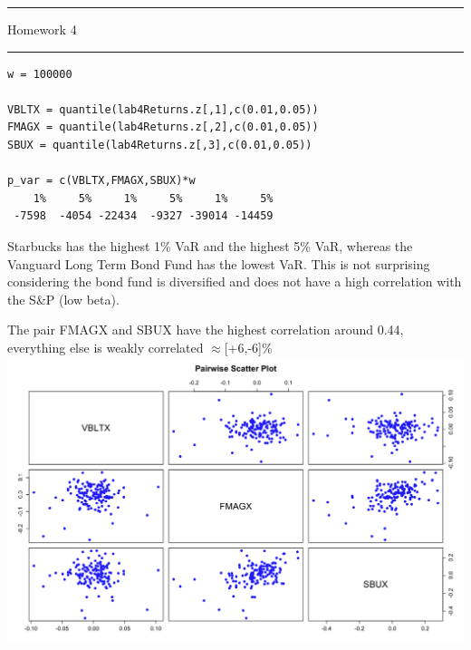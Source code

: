 \documentclass[letterpaper,12pt]{article}
\begin{document}
\thispagestyle{empty}

\hrule \vspace{0.5em}
 \hfill Homework 4 \newline \hrule

\vspace{1em}

\enumerate
\item \begin{lstlisting}
w = 100000

VBLTX = quantile(lab4Returns.z[,1],c(0.01,0.05))
FMAGX = quantile(lab4Returns.z[,2],c(0.01,0.05))
SBUX = quantile(lab4Returns.z[,3],c(0.01,0.05))

p_var = c(VBLTX,FMAGX,SBUX)*w
    1%     5%     1%     5%     1%     5% 
 -7598  -4054 -22434  -9327 -39014 -14459 
\end{lstlisting}
Starbucks has the highest 1\% VaR and the highest 5\% VaR, whereas the Vanguard Long Term Bond Fund has the lowest VaR. This is not surprising considering the bond fund is diversified and does not have a high correlation with the S\&P (low beta).

\item The pair FMAGX and SBUX have the highest correlation around 0.44, everything else is weakly correlated $\approx$[+6,-6]\% \\ 
	\includegraphics[scale = 0.35]{Pairs} \\
\end{document}
